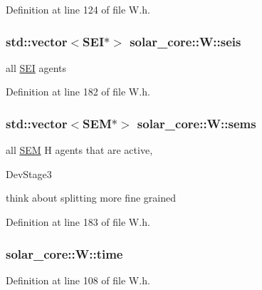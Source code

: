 Definition at line 124 of file W.\+h.

\hypertarget{classsolar__core_1_1_w_a311baa30390494ae8e79f26e372e716d}{}
\subsubsection[{seis}]{\setlength{\rightskip}{0pt plus 5cm}std\+::vector$<${\bf S\+E\+I}$\ast$$>$ solar\+\_\+core\+::\+W\+::seis\hspace{0.3cm}{\ttfamily [protected]}}\label{classsolar__core_1_1_w_a311baa30390494ae8e79f26e372e716d}
all \hyperlink{classsolar__core_1_1_s_e_i}{S\+E\+I} agents 

Definition at line 182 of file W.\+h.

\hypertarget{classsolar__core_1_1_w_ab6349cbc751747a05618dad4ebb1b726}{}
\subsubsection[{sems}]{\setlength{\rightskip}{0pt plus 5cm}std\+::vector$<${\bf S\+E\+M}$\ast$$>$ solar\+\_\+core\+::\+W\+::sems\hspace{0.3cm}{\ttfamily [protected]}}\label{classsolar__core_1_1_w_ab6349cbc751747a05618dad4ebb1b726}
all \hyperlink{classsolar__core_1_1_s_e_m}{S\+E\+M} H agents that are active,\begin{DoxyRefDesc}{Dev\+Stage3}
\item[\hyperlink{_dev_stage3__DevStage3000006}{Dev\+Stage3}]think about splitting more fine grained \end{DoxyRefDesc}


Definition at line 183 of file W.\+h.

\hypertarget{classsolar__core_1_1_w_ae96b30122adc9fae8fc2f209a4c89b0a}{}
\subsubsection[{time}]{ solar\+\_\+core\+::\+W\+::time}\label{classsolar__core_1_1_w_ae96b30122adc9fae8fc2f209a4c89b0a}


Definition at line 108 of file W.\+h.

